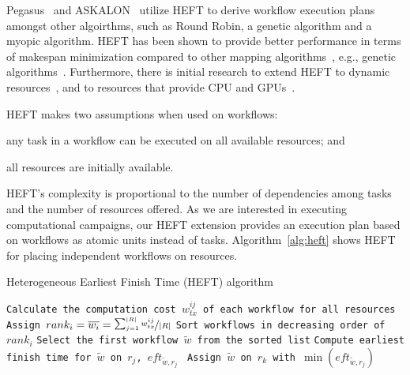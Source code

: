 Pegasus~\cite{deelman2015pegasus} and ASKALON~\cite{fahringer2005askalon}
utilize HEFT to derive workflow execution plans amongst other algoirthms, such
as Round Robin, a genetic algorithm and a myopic algorithm. HEFT
has been shown to provide better performance in terms of makespan minimization
compared to other mapping
algorithms~\cite{topcuoglu2002performance,canon2008comparative}, e.g., genetic
algorithms~\cite{fahringer2005askalon}. Furthermore, there is initial
research to extend HEFT to dynamic resources~\cite{dong2007pfas}, and to
resources that provide CPU and GPUs~\cite{shetti2013optimization}.

HEFT makes two assumptions when used on workflows:
\begin{inparaenum}[(1)]
    \item any task in a workflow can be executed on all available resources; and
    \item all resources are initially available.
\end{inparaenum}
HEFT's complexity is proportional to the number of dependencies among tasks
and the number of resources offered. As we are interested in executing
computational campaigns, our HEFT extension provides an execution plan based
on workflows as atomic units instead of tasks. Algorithm~\ref{alg:heft} shows
HEFT for placing independent workflows on resources.

\begin{algorithm}[t]
    \caption{Heterogeneous Earliest Finish Time (HEFT) algorithm}
    \label{alg:heft}
    \scriptsize
    \begin{algorithmic}[1]
        \State \texttt{Calculate the computation cost $w_{tx}^{ij}$ of each workflow for all resources}
        \State \texttt{Assign $rank_i = \overline{w_{i}} = \nicefrac{\sum_{j=1}^{|R|}w_{tx}^{ij}}{|R|}$}
        \State \texttt{Sort workflows in decreasing order of $rank_i$}
        \State \texttt{Select the first workflow $\tilde{w}$ from the sorted list}
        \State\texttt{Compute earliest finish time for $\tilde{w}$ on $r_{j}$, $eft_{\tilde{w},r_j}$ }
        \EndFor
        \State \texttt{Assign  $\tilde{w}$ on $r_k$ with $\min{(eft_{\tilde{w},r_j})}$}
        \EndWhile
        \EndProcedure
    \end{algorithmic}
\end{algorithm}


